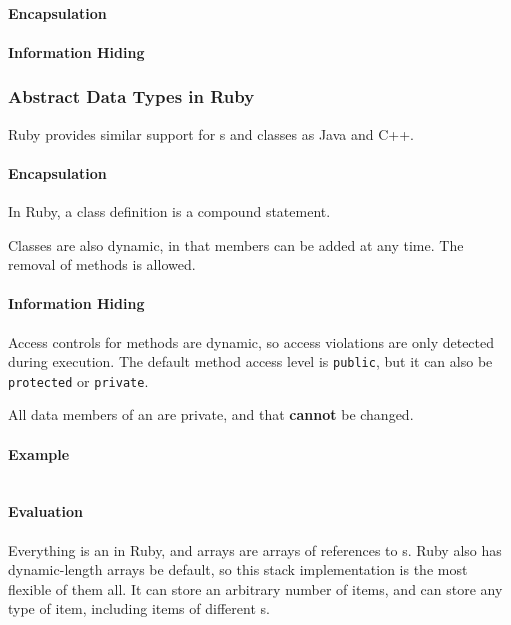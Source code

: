 \paragraph{Encapsulation}\label{par:Objective_C_Encapsulation}
\paragraph{Information Hiding}\label{par:Objective_C_Info_Hiding}

\subsubsection{Abstract Data Types in Ruby}\label{subsubsec:Abstract_Data_Types_Ruby}
Ruby provides similar support for s and classes as Java and C++.

\paragraph{Encapsulation}\label{par:Ruby_Encapsulation}
In Ruby, a class definition is a compound statement.

Classes are also dynamic, in that members can be added at any time.
The removal of methods is allowed.

\paragraph{Information Hiding}\label{par:Ruby_Info_Hiding}
Access controls for methods are dynamic, so access violations are only detected during execution.
The default method access level is \texttt{public}, but it can also be \texttt{protected} or \texttt{private}.

All data members of an  are private, and that \textbf{cannot} be changed.
\paragraph{Example}\label{par:Ruby_Abstract_Data_Type_Example}
\inputminted[frame=lines,linenos]{ruby}{./EDAP05-Concepts_Programming_Languages-Sections/Code/Class_Example-Stack-Ruby.rb}

\paragraph{Evaluation}\label{par:Ruby_Abstract_Data_Type_Evaluation}
Everything is an  in Ruby, and arrays are arrays of references to s.
Ruby also has dynamic-length arrays be default, so this stack implementation is the most flexible of them all.
It can store an arbitrary number of items, and can store any type of item, including items of different s.

